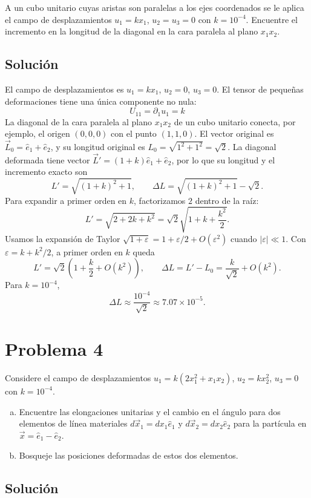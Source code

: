 \documentclass[a4paper]{article}
\begin{document}
A un cubo unitario cuyas aristas son paralelas a los ejes coordenados se le aplica el campo de desplazamientos $u_1 = kx_1$, $u_2 = u_3 = 0$ con $k = 10^{-4}$. Encuentre el incremento en la longitud de la diagonal en la cara paralela al plano $x_1x_2$.


\subsection{Solución}
El campo de desplazamientos es $u_1 = k x_1$, $u_2 = 0$, $u_3 = 0$.
El tensor de pequeñas deformaciones tiene una única componente no nula:
$$ U_{11} = \partial_1 u_1 = k $$
La diagonal de la cara paralela al plano $x_1 x_2$ de un cubo unitario conecta, por ejemplo, el origen $(0,0,0)$ con el punto $(1,1,0)$. El vector original es $\vec{L}_0 = \hat{e}_1 + \hat{e}_2$, y su longitud original es $L_0 = \sqrt{1^2 + 1^2} = \sqrt{2}$.
La diagonal deformada tiene vector $\vec{L}'=(1+k)\hat{e}_1+\hat{e}_2$, por lo que su longitud y el incremento exacto son
$$ L'=\sqrt{(1+k)^2+1}, \qquad \Delta L=\sqrt{(1+k)^2+1}-\sqrt{2}. $$
Para expandir a primer orden en $k$, factorizamos $2$ dentro de la raíz:
$$
L'=\sqrt{2+2k+k^2}
=\sqrt{2}\sqrt{1+k+\frac{k^2}{2}}.
$$
Usamos la expansión de Taylor $\sqrt{1+\varepsilon}=1+\varepsilon/2+O(\varepsilon^2)$ cuando $|\varepsilon|\ll1$. Con $\varepsilon=k+k^2/2$, a primer orden en $k$ queda
$$
L'=\sqrt{2}\left(1+\frac{k}{2}+O(k^2)\right),
\qquad
\Delta L=L'-L_0=\frac{k}{\sqrt{2}}+O(k^2).
$$
Para $k=10^{-4}$,
$$ \Delta L\approx\frac{10^{-4}}{\sqrt{2}}\approx 7.07\times10^{-5}. $$

\section{Problema 4}

Considere el campo de desplazamientos $u_1 = k(2x_1^2 + x_1x_2)$, $u_2 = kx_2^2$, $u_3 = 0$ con $k = 10^{-4}$.
\begin{enumerate}[(a)]
    \item Encuentre las elongaciones unitarias y el cambio en el ángulo para dos elementos de línea materiales $d\vec{x}_1 = dx_1\hat{e}_1$ y $d\vec{x}_2 = dx_2\hat{e}_2$ para la partícula en $\vec{x} = \hat{e}_1 - \hat{e}_2$.
    \item Bosqueje las posiciones deformadas de estos dos elementos.
\end{enumerate}

\subsection{Solución}
\end{document}
